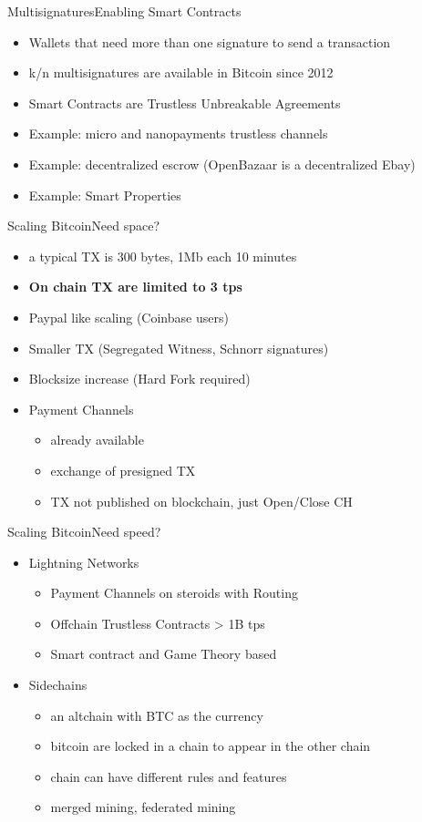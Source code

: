 \documentclass[english,compress]{beamer}
\begin{document}
\begin{frame}{Multisignatures}{Enabling Smart Contracts}
\begin{itemize}
\item Wallets that need more than one signature to send a transaction
\item k/n multisignatures are available in Bitcoin since 2012
\item Smart Contracts are Trustless Unbreakable Agreements
\item Example: micro and nanopayments trustless channels
\item Example: decentralized escrow (OpenBazaar is a decentralized Ebay)
\item Example: Smart Properties
\end{itemize}
\end{frame}

\begin{frame}{Scaling Bitcoin}{Need space?}
\begin{itemize}
\item a typical TX is 300 bytes, 1Mb each 10 minutes
\item \textbf{On chain TX are limited to 3 tps}
\item Paypal like scaling (Coinbase users)
\item Smaller TX (Segregated Witness, Schnorr signatures)
\item Blocksize increase (Hard Fork required)
\item Payment Channels
 \begin{itemize}
  \item already available
  \item exchange of presigned TX
  \item TX not published on blockchain, just Open/Close CH
 \end{itemize}
\end{itemize}
\end{frame} 

\begin{frame}{Scaling Bitcoin}{Need speed?}
\begin{itemize}
 \item Lightning Networks 
  \begin{itemize}
    \item Payment Channels on steroids with Routing
    \item Offchain Trustless Contracts > 1B tps
    \item Smart contract and Game Theory based
   \end{itemize}
 \item Sidechains
  \begin{itemize}
    \item an altchain with BTC as the currency
    \item bitcoin are locked in a chain to appear in the other chain
    \item chain can have different rules and features
    \item merged mining, federated mining
  \end{itemize}
\end{itemize}
\end{frame}
\end{document}
